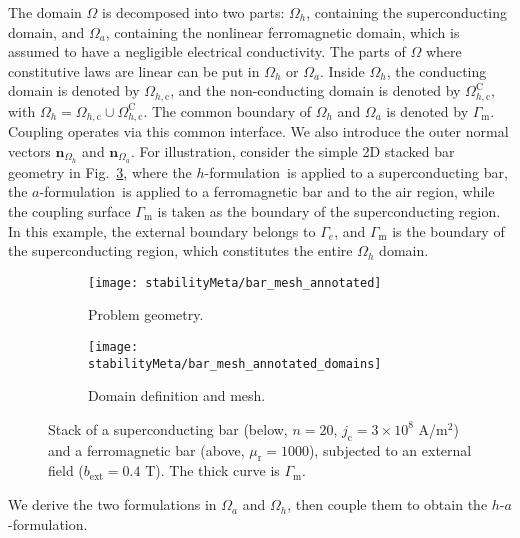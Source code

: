 \documentclass[journal]{IEEEtran}
\renewcommand{\vec}[1]{\boldsymbol{#1}} %
\newcommand{\n}{\vec n}
\newcommand{\jc}{j_{\text{c}}}
\renewcommand{\O}{\Omega}
\newcommand{\Oa}{\Omega_a}
\newcommand{\Oh}{\Omega_h}
\newcommand{\Ohc}{\Omega_{h,\text{c}}}
\newcommand{\Ohcc}{\Omega_{h,\text{c}}^{\text{C}}}
\newcommand{\Gm}{\Gamma_\text{m}}
\newcommand{\af}{$a$-formulation\ }
\newcommand{\hf}{$h$-formulation\ }
\newcommand{\hafOnly}{$h$-$a$-formulation}
\begin{document}
The domain $\O$ is decomposed into two parts: $\Oh$, containing the superconducting domain, and $\Oa$, containing the nonlinear ferromagnetic domain, which is assumed to have a negligible electrical conductivity. The parts of $\O$ where constitutive laws are linear can be put in $\Oh$ or $\Oa$. Inside $\Oh$, the conducting domain is denoted by $\Ohc$, and the non-conducting domain is denoted by $\Ohcc$, with $\Oh = \Ohc \cup \Ohcc$. The common boundary of $\Oh$ and $\Oa$ is denoted by $\Gm$. Coupling operates via this common interface. We also introduce the outer normal vectors $\n_{\Oh}$ and $\n_{\Oa}$. For illustration, consider the simple 2D stacked bar geometry in Fig.~\ref{bar_b}, where the \hf is applied to a superconducting bar, the \af is applied to a ferromagnetic bar and to the air region, while the coupling surface $\Gm$ is taken as the boundary of the superconducting region. In this example, the external boundary belongs to $\Gamma_e$, and $\Gm$ is the boundary of the superconducting region, which constitutes the entire $\Oh$ domain.

\begin{figure}[h!]
\centering
            \begin{subfigure}[b]{0.49\linewidth}
            \centering
		\texttt{[image: stabilityMeta/bar\_mesh\_annotated]}
		\caption{Problem geometry.}
		\label{bar_mesh}
        \end{subfigure}
\begin{subfigure}[b]{0.49\linewidth}  
            \centering 
		\texttt{[image: stabilityMeta/bar\_mesh\_annotated\_domains]}
		\caption{Domain definition and mesh.}
		\label{bar_a1_h1}	
      \end{subfigure}
        \caption{Stack of a superconducting bar (below,  $n=20$, $\jc=3\times 10^8$ A/m$^2$) and a ferromagnetic bar (above, $\mu_\text{r} = 1000$), subjected to an external field ($b_{\text{ext}} = 0.4$ T). The thick curve is $\Gm$.}
        \label{bar_b}
\end{figure}

We derive the two formulations in $\Oa$ and $\Oh$, then couple them to obtain the \hafOnly.
\end{document}

